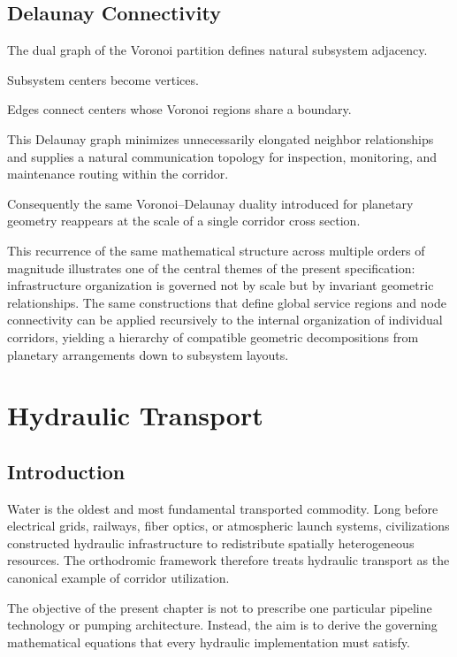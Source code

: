 \documentclass[11pt,fleqn]{book}
\numberwithin{equation}{chapter}
\theoremstyle{plain}
\theoremstyle{definition}
\theoremstyle{remark}
\begin{document}

\section{Delaunay Connectivity}

The dual graph of the Voronoi partition defines natural subsystem
adjacency.

Subsystem centers become vertices.

Edges connect centers whose Voronoi regions share a boundary.

This Delaunay graph minimizes unnecessarily elongated neighbor
relationships and supplies a natural communication topology for
inspection, monitoring, and maintenance routing within the corridor.

Consequently the same Voronoi--Delaunay duality introduced for planetary
geometry reappears at the scale of a single corridor cross section.

This recurrence of the same mathematical structure across multiple
orders of magnitude illustrates one of the central themes of the present
specification: infrastructure organization is governed not by scale but
by invariant geometric relationships. The same constructions that define
global service regions and node connectivity can be applied recursively
to the internal organization of individual corridors, yielding a
hierarchy of compatible geometric decompositions from planetary
arrangements down to subsystem layouts.

\chapter{Hydraulic Transport}

\section{Introduction}

Water is the oldest and most fundamental transported commodity.
Long before electrical grids, railways, fiber optics, or atmospheric
launch systems, civilizations constructed hydraulic infrastructure to
redistribute spatially heterogeneous resources. The orthodromic
framework therefore treats hydraulic transport as the canonical example
of corridor utilization.

The objective of the present chapter is not to prescribe one particular
pipeline technology or pumping architecture. Instead, the aim is to
derive the governing mathematical equations that every hydraulic
implementation must satisfy.
\end{document}
